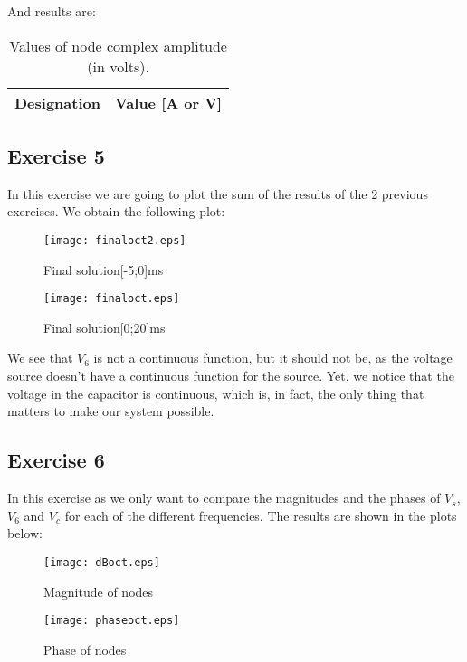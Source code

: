 And results are:

\begin{table}[H]
  \centering
  \begin{tabular}{|c|c|}
    \hline
        {\bf Designation} & {\bf Value [A or V]} \\ \hline
        
  \end{tabular}
  \caption{Values of node complex amplitude (in volts).}
  \label{tab:Exercise2Theoretical}
\end{table}

\subsection{Exercise 5}
In this exercise we are going to plot the sum of the results of the 2 previous exercises. We obtain the following plot:


\begin{figure}[h] \centering
\texttt{[image: finaloct2.eps]}
\caption{Final solution[-5;0]ms}
\label{fig:finaloct}
\end{figure}
\begin{figure}[h] \centering
\texttt{[image: finaloct.eps]}
\caption{Final solution[0;20]ms}
\label{fig:finaloct}
\end{figure}

We see that $V_6$ is not a continuous function, but it should not be, as the voltage source doesn't have a continuous function for the source. Yet, we notice that the voltage in the capacitor is continuous, which is, in fact, the only thing that matters to make our system possible.


\subsection{Exercise 6}
In this exercise as we only want to compare the magnitudes and the phases of $V_s$,$V_6$ and $V_c$ for each of the different frequencies. The results are shown in the plots below:
\begin{figure}[h] \centering
\texttt{[image: dBoct.eps]}
\caption{Magnitude of nodes}
\label{fig:finaloct}
\end{figure}

\begin{figure}[h] \centering
\texttt{[image: phaseoct.eps]}
\caption{Phase of nodes}
\label{fig:finaloct}
\end{figure}

